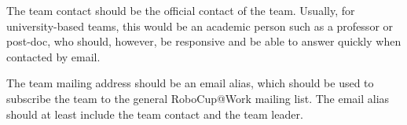 The team contact should be the official contact of the team. Usually, for university-based teams, this would be an academic person such as a professor or post-doc, who should, however, be responsive and be able to answer quickly when contacted by email.
\par
The team mailing address should be an email alias, which should be used to subscribe the team to the general RoboCup@Work mailing list. The email alias should at least include the team contact and the team leader.
